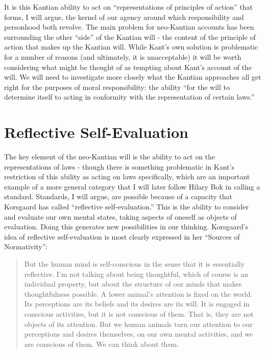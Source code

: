 \documentclass[phd,12pt,oneside,paper=letterpaper]{ubcthesis}
\begin{document}
It is this Kantian ability to act on ``representations of principles of action'' that forms, I will argue, the kernel of our agency around which responsibility and personhood both revolve. The main problem for neo-Kantian accounts has been surrounding the other ``side'' of the Kantian will - the content of the principle of action that makes up the Kantian will. While Kant's own solution is problematic for a number of reasons (and ultimately, it is unacceptable) it will be worth considering what might be thought of as tempting about Kant's account of the will. We will need to investigate more closely what the Kantian approaches all get right for the purposes of moral responsibility: the ability ``for the will to determine itself to acting in conformity with the representation of certain laws.''

\section{Reflective Self-Evaluation}
The key element of the neo-Kantian will is the ability to act on the representations of laws - though there is something problematic in Kant's restriction of this ability as acting on laws specifically, which are an important example of a more general category that I will later follow Hilary Bok in calling a standard.  Standards, I will argue, are possible because of a capacity that Korsgaard has called ``reflective self-evaluation.'' This is the ability to consider and evaluate our own mental states, taking aspects of oneself as objects of evaluation. Doing this generates new possibilities in our thinking. Korsgaard's idea of reflective self-evaluation is most clearly expressed in her ``Sources of Normativity'':

\begin{quote}
But the human mind is self-conscious in the sense that it is essentially reflective. I'm not talking about being thoughtful, which of course is an individual property, but about the structure of our minds that makes thoughtfulness possible. A lower animal's attention is fixed on the world. Its perceptions are its beliefs and its desires are its will. It is engaged in conscious activities, but it is not conscious of them. That is, they are not objects of its attention. But we human animals turn our attention to our perceptions and desires themselves, on our own mental activities, and we are conscious of them. We can think about them. \citep[p.93]{korsgaard1996}
\end{quote}
\end{document}
